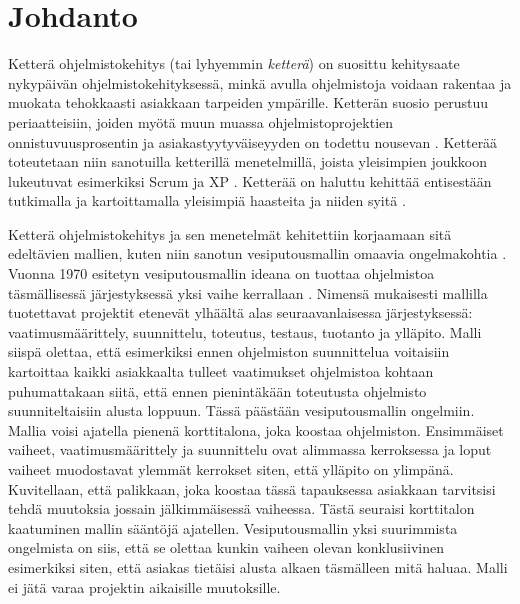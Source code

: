 \chapter{Johdanto\label{intro}}

Ketterä ohjelmistokehitys (tai lyhyemmin \textit{ketterä}) on suosittu kehitysaate nykypäivän ohjelmistokehityksessä, minkä avulla ohjelmistoja voidaan rakentaa ja muokata tehokkaasti asiakkaan tarpeiden ympärille. Ketterän suosio perustuu periaatteisiin, joiden myötä muun muassa ohjelmistoprojektien onnistuvuusprosentin ja asiakastyytyväiseyyden on todettu nousevan \cite{9533020}. Ketterää toteutetaan niin sanotuilla ketterillä menetelmillä, joista yleisimpien joukkoon lukeutuvat esimerkiksi Scrum \cite{SCRUMORG} ja XP \cite{XPORG}. Ketterää on haluttu kehittää entisestään tutkimalla ja kartoittamalla yleisimpiä haasteita ja niiden syitä \cite{7872736}.

Ketterä ohjelmistokehitys ja sen menetelmät kehitettiin korjaamaan sitä edeltävien mallien, kuten niin sanotun vesiputousmallin omaavia ongelmakohtia \cite{beck2001agile}. Vuonna 1970 esitetyn vesiputousmallin ideana on tuottaa ohjelmistoa täsmällisessä järjestyksessä yksi vaihe kerrallaan \cite{10.5555/41765.41801}. Nimensä mukaisesti mallilla tuotettavat projektit etenevät ylhäältä alas seuraavanlaisessa järjestyksessä: vaatimusmäärittely, suunnittelu, toteutus, testaus, tuotanto ja ylläpito. Malli siispä olettaa, että esimerkiksi ennen ohjelmiston suunnittelua voitaisiin kartoittaa kaikki asiakkaalta tulleet vaatimukset ohjelmistoa kohtaan puhumattakaan siitä, että ennen pienintäkään toteutusta ohjelmisto suunniteltaisiin alusta loppuun. Tässä päästään vesiputousmallin ongelmiin. Mallia voisi ajatella pienenä korttitalona, joka koostaa ohjelmiston. Ensimmäiset vaiheet, vaatimusmäärittely ja suunnittelu ovat alimmassa kerroksessa ja loput vaiheet muodostavat ylemmät kerrokset siten, että ylläpito on ylimpänä. Kuvitellaan, että palikkaan, joka koostaa tässä tapauksessa asiakkaan tarvitsisi tehdä muutoksia jossain jälkimmäisessä vaiheessa. Tästä seuraisi korttitalon kaatuminen mallin sääntöjä ajatellen. Vesiputousmallin yksi suurimmista ongelmista on siis, että se olettaa kunkin vaiheen olevan konklusiivinen esimerkiksi siten, että asiakas tietäisi alusta alkaen täsmälleen mitä haluaa. Malli ei jätä varaa projektin aikaisille muutoksille.

